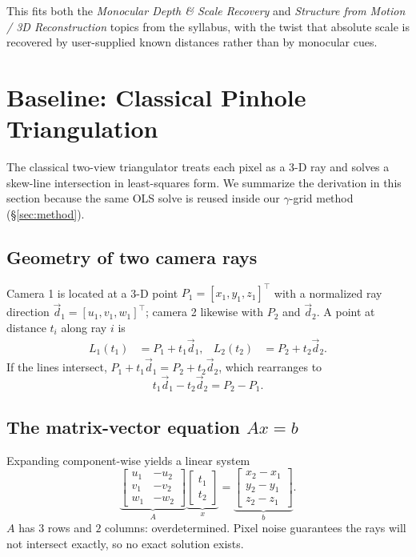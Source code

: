 \documentclass[11pt]{article}
\begin{document}
This fits both the \emph{Monocular Depth \& Scale Recovery} and \emph{Structure from
Motion / 3D Reconstruction} topics from the syllabus, with the twist that absolute
scale is recovered by user-supplied known distances rather than by monocular cues.

\section{Baseline: Classical Pinhole Triangulation}
\label{sec:baseline}

The classical two-view triangulator treats each pixel as a 3-D ray and solves a
skew-line intersection in least-squares form. We summarize the derivation in this
section because the same OLS solve is reused inside our $\gamma$-grid method
(\S\ref{sec:method}).

\subsection{Geometry of two camera rays}

Camera 1 is located at a 3-D point $P_1 = [x_1, y_1, z_1]^\top$ with a normalized ray
direction $\vec d_1 = [u_1, v_1, w_1]^\top$; camera 2 likewise with $P_2$ and $\vec
d_2$. A point at distance $t_i$ along ray $i$ is
\begin{align*}
L_1(t_1) &= P_1 + t_1 \vec d_1, &
L_2(t_2) &= P_2 + t_2 \vec d_2.
\end{align*}
If the lines intersect, $P_1 + t_1 \vec d_1 = P_2 + t_2 \vec d_2$, which rearranges to
\[
t_1 \vec d_1 - t_2 \vec d_2 = P_2 - P_1.
\]

\subsection{The matrix-vector equation $Ax = b$}

Expanding component-wise yields a linear system
\[
\underbrace{\begin{bmatrix} u_1 & -u_2\\ v_1 & -v_2\\ w_1 & -w_2 \end{bmatrix}}_{A}
\underbrace{\begin{bmatrix} t_1\\t_2 \end{bmatrix}}_{x}
=
\underbrace{\begin{bmatrix} x_2-x_1\\y_2-y_1\\z_2-z_1 \end{bmatrix}}_{b}.
\]
$A$ has $3$ rows and $2$ columns: overdetermined. Pixel noise guarantees the rays will
not intersect exactly, so no exact solution exists.
\end{document}
